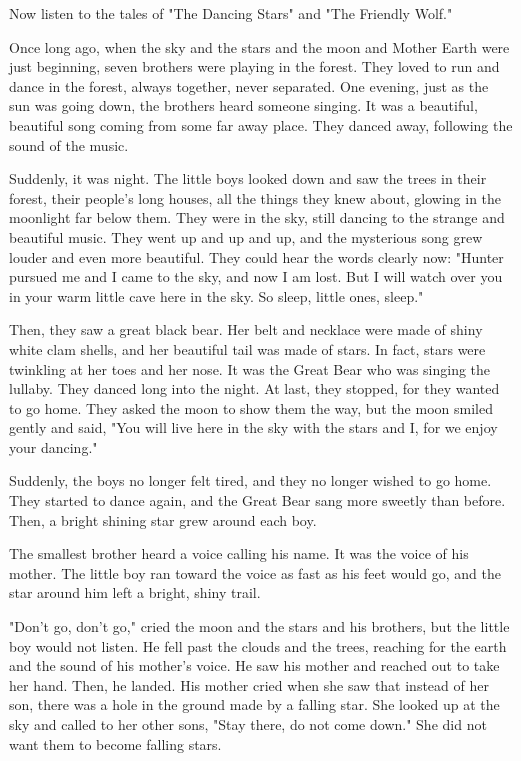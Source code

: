 Now listen to the tales of "The Dancing Stars" and "The Friendly Wolf."

Once long ago, when the sky and the stars and the moon and Mother Earth were just beginning, seven brothers were playing in the forest. They loved to run and dance in the forest, always together, never separated. One evening, just as the sun was going down, the brothers heard someone singing. It was a beautiful, beautiful song coming from some far away place. They danced away, following the sound of the music.

Suddenly, it was night. The little boys looked down and saw the trees in their forest, their people's long houses, all the things they knew about, glowing in the moonlight far below them. They were in the sky, still dancing to the strange and beautiful music. They went up and up and up, and the mysterious song grew louder and even more beautiful. They could hear the words clearly now: "Hunter pursued me and I came to the sky, and now I am lost. But I will watch over you in your warm little cave here in the sky. So sleep, little ones, sleep."

Then, they saw a great black bear. Her belt and necklace were made of shiny white clam shells, and her beautiful tail was made of stars. In fact, stars were twinkling at her toes and her nose. It was the Great Bear who was singing the lullaby. They danced long into the night. At last, they stopped, for they wanted to go home. They asked the moon to show them the way, but the moon smiled gently and said, "You will live here in the sky with the stars and I, for we enjoy your dancing."

Suddenly, the boys no longer felt tired, and they no longer wished to go home. They started to dance again, and the Great Bear sang more sweetly than before. Then, a bright shining star grew around each boy.

The smallest brother heard a voice calling his name. It was the voice of his mother. The little boy ran toward the voice as fast as his feet would go, and the star around him left a bright, shiny trail.

"Don't go, don't go," cried the moon and the stars and his brothers, but the little boy would not listen. He fell past the clouds and the trees, reaching for the earth and the sound of his mother's voice. He saw his mother and reached out to take her hand. Then, he landed. His mother cried when she saw that instead of her son, there was a hole in the ground made by a falling star. She looked up at the sky and called to her other sons, "Stay there, do not come down." She did not want them to become falling stars.

